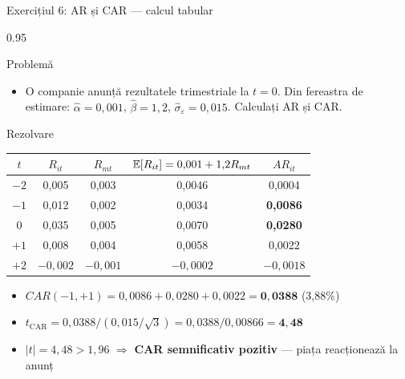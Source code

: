 \documentclass[9pt, aspectratio=169, t]{beamer}
\begin{document}
\begin{frame}[shrink=15]{Exercițiul 6: AR și CAR --- calcul tabular}
\begin{cminipage}{0.95\textwidth}
\begin{block}{Problemă}
\begin{itemize}\setlength{\itemsep}{0pt}
    \item O companie anunță rezultatele trimestriale la $t=0$. Din fereastra de estimare: $\hat\alpha = 0{,}001$, $\hat\beta = 1{,}2$, $\hat\sigma_\varepsilon = 0{,}015$. Calculați AR și CAR.
\end{itemize}
\end{block}

\begin{exampleblock}{Rezolvare}
\renewcommand{\arraystretch}{1.1}
\begin{center}
\footnotesize
\begin{tabular}{ccccc}
\toprule
$t$ & $R_{it}$ & $R_{mt}$ & $\mathbb{E}[R_{it}] = 0{,}001 + 1{,}2 R_{mt}$ & $AR_{it}$ \\
\midrule
$-2$ & 0{,}005 & 0{,}003 & 0{,}0046 & 0{,}0004 \\
$-1$ & 0{,}012 & 0{,}002 & 0{,}0034 & \textcolor{Forest}{\textbf{0{,}0086}} \\
$0$ & 0{,}035 & 0{,}005 & 0{,}0070 & \textcolor{Forest}{\textbf{0{,}0280}} \\
$+1$ & 0{,}008 & 0{,}004 & 0{,}0058 & 0{,}0022 \\
$+2$ & $-0{,}002$ & $-0{,}001$ & $-0{,}0002$ & $-0{,}0018$ \\
\bottomrule
\end{tabular}
\end{center}

\small
\begin{itemize}\setlength{\itemsep}{0pt}
    \item $CAR(-1, +1) = 0{,}0086 + 0{,}0280 + 0{,}0022 = \mathbf{0{,}0388}$ (3{,}88\%)
    \item $t_{\text{CAR}} = 0{,}0388 / (0{,}015 / \sqrt{3}) = 0{,}0388 / 0{,}00866 = \mathbf{4{,}48}$
    \item $|t| = 4{,}48 > 1{,}96$ $\Rightarrow$ \textcolor{Forest}{\textbf{CAR semnificativ pozitiv}} --- piața reacționează la anunț
\end{itemize}
\end{exampleblock}
\end{cminipage}
\end{frame}
\end{document}
